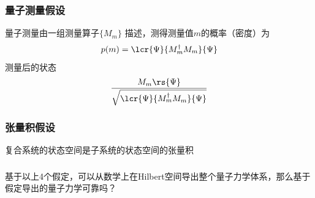 \begin{frame}
    \frametitle{量子测量假设}
    \begin{tcolorbox4}[3. 量子测量假设]
    量子测量由一组测量算子$\{ M_m\}$ 描述，测得测量值$m$的概率（密度）为
    \[ p(m)=\lcr{\Psi}{M_m ^\dagger M_m}{\Psi} 
     \]
     测量后的状态 \[\frac{M_m\rs{\Psi}}{\sqrt{\lcr{\Psi}{M_m ^\dagger M_m}{\Psi}}}\]
    \end{tcolorbox4}
\end{frame}

\begin{frame}
    \frametitle{张量积假设}
    \begin{tcolorbox4}[4. 复合系统假设]
    复合系统的状态空间是子系统的状态空间的张量积
    \end{tcolorbox4}
\end{frame}

\begin{frame}
    \frametitle{}
    \begin{tcolorbox3}[学术讨论]
        基于以上4个假定，可以从数学上在Hilbert空间导出整个量子力学体系，那么基于假定导出的量子力学可靠吗？
    \end{tcolorbox3}
\end{frame}